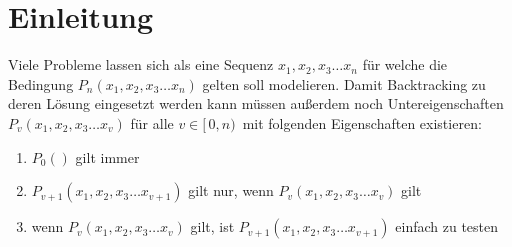 \chapter{Einleitung}\label{einleitung}
Viele Probleme lassen sich als eine Sequenz $x_{1}, x_{2}, x_{3} \dots x_{n}$ für 
welche die Bedingung $P_{n}(x_{1}, x_{2}, x_{3} \dots x_{n})$ gelten soll modelieren.
Damit Backtracking zu deren Lösung eingesetzt werden kann müssen außerdem noch
Untereigenschaften $P_{v}(x_{1}, x_{2}, x_{3} \dots x_{v})$ für alle $v \in [ \, 0, n) \,$ 
mit folgenden Eigenschaften existieren:
\begin{enumerate}
  \item $P_{0}()$ gilt immer
  \item $P_{v + 1}(x_{1}, x_{2}, x_{3} \dots x_{v + 1})$ gilt nur, wenn $P_{v}(x_{1}, x_{2}, x_{3} \dots x_{v})$ gilt
  \item wenn $P_{v}(x_{1}, x_{2}, x_{3} \dots x_{v})$ gilt, ist $P_{v + 1}(x_{1}, x_{2}, x_{3} \dots x_{v+1})$ einfach zu testen
\end{enumerate}